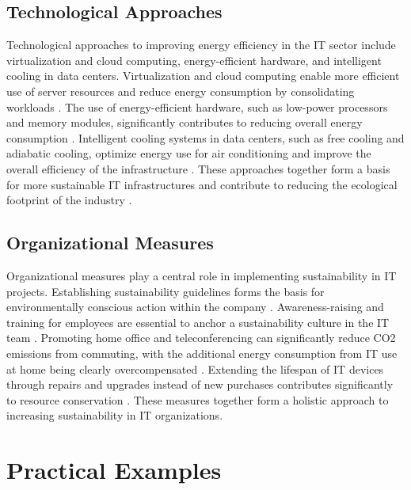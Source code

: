 \documentclass[10pt,twocolumn,conference]{IEEEtran}
\begin{document}
\subsection{Technological Approaches}
Technological approaches to improving energy efficiency in the IT sector include virtualization and cloud computing, energy-efficient hardware, and intelligent cooling in data centers. Virtualization and cloud computing enable more efficient use of server resources and reduce energy consumption by consolidating workloads \cite{murugesan2008}. The use of energy-efficient hardware, such as low-power processors and memory modules, significantly contributes to reducing overall energy consumption \cite{tomlinson2010}. Intelligent cooling systems in data centers, such as free cooling and adiabatic cooling, optimize energy use for air conditioning and improve the overall efficiency of the infrastructure \cite{oró2015}. These approaches together form a basis for more sustainable IT infrastructures and contribute to reducing the ecological footprint of the industry \cite{jenkin2011}.

\subsection{Organizational Measures}
Organizational measures play a central role in implementing sustainability in IT projects. Establishing sustainability guidelines forms the basis for environmentally conscious action within the company \cite{murugesan2008}. Awareness-raising and training for employees are essential to anchor a sustainability culture in the IT team \cite{jenkin2011}. Promoting home office and teleconferencing can significantly reduce CO2 emissions from commuting, with the additional energy consumption from IT use at home being clearly overcompensated \cite{tomlinson2010}. Extending the lifespan of IT devices through repairs and upgrades instead of new purchases contributes significantly to resource conservation \cite{baldé2017}. These measures together form a holistic approach to increasing sustainability in IT organizations.

\section{Practical Examples}
\end{document}
